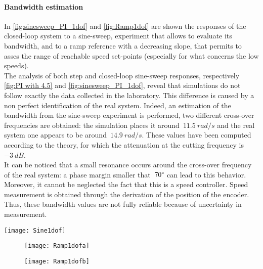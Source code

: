 \paragraph{Bandwidth estimation}
\label{par:1dof_vel_bwEstimation}
In \cref{fig:sinesweep_PI_1dof} and \cref{fig:Ramp1dof} are shown the responses of the closed-loop system to a sine-sweep, experiment that allows to evaluate its bandwidth, and to a ramp reference with a decreasing slope, that permits to asses the range of reachable speed set-points (especially for what concerns the low speeds). \\
The analysis of both step and closed-loop sine-sweep responses, respectively \cref{fig:PI with 4.5} and \cref{fig:sinesweep_PI_1dof}, reveal that simulations do not follow exactly the data collected in the laboratory. This difference is caused by a non perfect identification of the real system. Indeed, an estimation of the bandwidth from the sine-sweep experiment is performed, two different cross-over frequencies are obtained: the simulation places it around~$11.5\ rad/s$ and the real system one appears to be around~$14.9\ rad/s$. These values have been computed according to the theory, for which the attenuation at the cutting frequency is~$-3\ dB$. \\
It can be noticed that a small resonance occurs around the cross-over frequency of the real system: a phase margin smaller that~$70 \degree$ can lead to this behavior. \\
Moreover, it cannot be neglected the fact that this is a speed controller. Speed measurement is obtained through the derivation of the position of the encoder. Thus, these bandwidth values are not fully reliable because of uncertainty in measurement.
\begin{figure*}[h]
	\centering
	\texttt{[image: Sine1dof]}
	\caption{Sineweep experiment from $0.1\ Hz$ to $10\ Hz$ in $100\ s$}
	\label{fig:sinesweep_PI_1dof}
\end{figure*}
\begin{figure*}[h]
	\centering
	\begin{subfigure}{0.4\columnwidth}
		\texttt{[image: Ramp1dofa]}
	\end{subfigure}
	\begin{subfigure}{0.4\columnwidth}
		\texttt{[image: Ramp1dofb]}
	\end{subfigure}
	\caption{Ramp experiment from $17\ rad/s$ to $0\ rad/s$ in $100\ s$}
	\label{fig:Ramp1dof}
\end{figure*}

